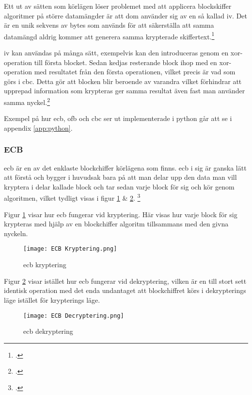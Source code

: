 Ett ut av sätten som körlägen löser problemet med att applicera blockskiffer algoritmer på
större datamängder är att dom använder sig av en så kallad \acrfull{iv}. Det är en unik sekvens
av bytes som används för att säkerställa att samma datamängd aldrig kommer att generera samma
krypterade skiffertext.\footcite{dworkin2001sp}

\acrshort{iv} kan användas på många sätt, exempelvis kan den introduceras genom en
\gls{xor}-operation till första blocket. Sedan kedjas resterande block ihop med en \gls{xor}-operation med resultatet från
den första operationen, vilket precis är vad som görs i \acrshort{cbc}. Detta gör att blocken blir beroende av varandra
vilket förhindrar att upprepad information som krypteras ger samma resultat även fast man använder samma
nyckel.\footcite{dworkin2001sp}

Exempel på hur \acrshort{ecb}, \acrshort{ofb} och \acrshort{cbc} ser ut implementerade i \gls{python} går att se i appendix \ref{app:python}.

\subsubsection{ECB}
\label{sec:ecb}
\acrfull{ecb} är en av det enklaste blockchiffer körlägena som finns.
\acrshort{ecb} i sig är ganska lätt att förstå och bygger i huvudsak bara på
att man delar upp den data man vill kryptera i delar kallade block och tar sedan varje
block för sig och kör genom algoritmen, vilket tydligt visas i
figur \ref{fig:ecb-mode-enc} \& \ref{fig:ecb-mode-dec}.
\footcite{dworkin2001sp}

Figur \ref{fig:ecb-mode-enc} visar hur \acrshort{ecb} fungerar vid kryptering.
Här visas hur varje block för sig krypteras med hjälp av en blockchiffer algoritm
tillsammans med den givna nyckeln.

\begin{figure}[H]
    \texttt{[image: ECB Kryptering.png]}
    \caption{\acrlong{ecb} kryptering}
    \label{fig:ecb-mode-enc}
\end{figure}

Figur \ref{fig:ecb-mode-dec} visar istället hur \acrshort{ecb} fungerar vid
dekryptering, vilken är en till stort sett identisk operation med det enda undantaget
att blockchiffret körs i dekrypterings läge istället för krypterings läge.

\begin{figure}[H]
    \texttt{[image: ECB Decryptering.png]}
    \caption{\acrlong{ecb} dekryptering}
    \label{fig:ecb-mode-dec}
\end{figure}


